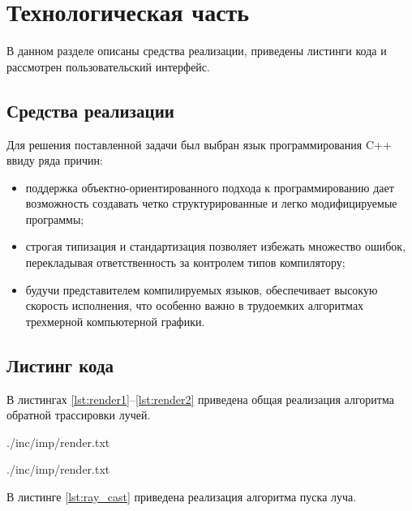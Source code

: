 \chapter{Технологическая часть}

В данном разделе описаны средства реализации, приведены листинги кода и рассмотрен пользовательский интерфейс.

\section{Средства реализации}

Для решения поставленной задачи был выбран язык программирования C++ ввиду ряда причин:
\begin{itemize}
	\item поддержка объектно-ориентированного подхода к программированию дает возможность создавать четко структурированные и легко модифицируемые программы;
	\item строгая типизация и стандартизация позволяет избежать множество ошибок, перекладывая ответственность за контролем типов компилятору;
	\item будучи представителем компилируемых языков, обеспечивает высокую скорость исполнения, что особенно важно в трудоемких алгоритмах трехмерной компьютерной графики.
\end{itemize}

\section{Листинг кода}

\captionsetup{singlelinecheck = false, justification=raggedright}

В листингах \ref{lst:render1}--\ref{lst:render2} приведена общая реализация алгоритма обратной трассировки лучей.

\begin{lstinputlisting}[
	caption={Алгоритм трассировки лучей (часть 1)},
	label={lst:render1},
	style={go},
	linerange={1-8},
	]{./inc/imp/render.txt}
\end{lstinputlisting}

\begin{lstinputlisting}[
	caption={Алгоритм трассировки лучей (часть 2)},
	label={lst:render2},
	style={go},
	linerange={9-13},
	]{./inc/imp/render.txt}
\end{lstinputlisting}

В листинге \ref{lst:ray_cast} приведена реализация алгоритма пуска луча.

